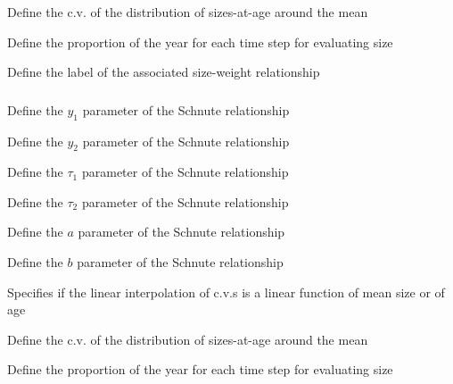  {Define the c.v. of the distribution of sizes-at-age around the mean}

 {Define the proportion of the year for each time step for evaluating size}

 {Define the label of the associated size-weight relationship}

\subsubsection[Schnute]{}

 {Define the $y_1$ parameter of the Schnute relationship}

 {Define the $y_2$ parameter of the Schnute relationship}

 {Define the $\tau_1$ parameter of the Schnute relationship}

 {Define the $\tau_2$ parameter of the Schnute relationship}

 {Define the $a$ parameter of the Schnute relationship}

 {Define the $b$ parameter of the Schnute relationship}

 {Specifies if the linear interpolation of c.v.s is a linear function of mean size or of age}

 {Define the c.v. of the distribution of sizes-at-age around the mean}

 {Define the proportion of the year for each time step for evaluating size}

